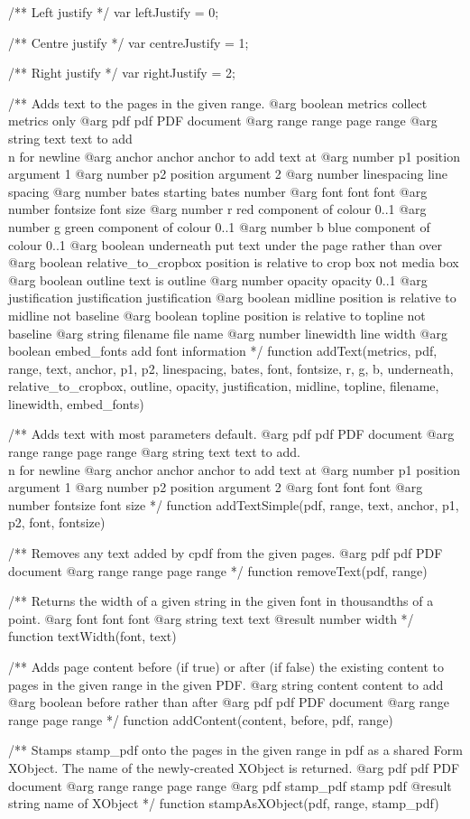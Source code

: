 /** Left justify */
var leftJustify = 0;

/** Centre justify */
var centreJustify = 1;

/** Right justify */
var rightJustify = 2;

/** Adds text to the pages in the given range.
@arg {boolean} metrics collect metrics only
@arg {pdf} pdf PDF document
@arg {range} range page range
@arg {string} text text to add \\n for newline
@arg {anchor} anchor anchor to add text at
@arg {number} p1 position argument 1
@arg {number} p2 position argument 2
@arg {number} linespacing line spacing
@arg {number} bates starting bates number
@arg {font} font font
@arg {number} fontsize font size
@arg {number} r red component of colour 0..1
@arg {number} g green component of colour 0..1
@arg {number} b blue component of colour 0..1
@arg {boolean} underneath put text under the page rather than over
@arg {boolean} relative_to_cropbox position is relative to crop box not media box
@arg {boolean} outline text is outline
@arg {number} opacity opacity 0..1
@arg {justification} justification justification
@arg {boolean} midline position is relative to midline not baseline
@arg {boolean} topline position is relative to topline not baseline
@arg {string} filename file name
@arg {number} linewidth line width
@arg {boolean} embed_fonts add font information
*/
function addText(metrics, pdf, range, text, anchor, p1, p2, linespacing,
                 bates, font, fontsize, r, g, b, underneath, relative_to_cropbox, outline,
                 opacity, justification, midline, topline, filename, linewidth, embed_fonts) {}

/** Adds text with most parameters default.
@arg {pdf} pdf PDF document
@arg {range} range page range
@arg {string} text text to add. \\n for newline
@arg {anchor} anchor anchor to add text at
@arg {number} p1 position argument 1
@arg {number} p2 position argument 2
@arg {font} font font
@arg {number} fontsize font size */
function addTextSimple(pdf, range, text, anchor, p1, p2, font, fontsize) {}

/** Removes any text added by cpdf from the given pages.
@arg {pdf} pdf PDF document
@arg {range} range page range */
function removeText(pdf, range) {}

/** Returns the width of a given string in the given font in thousandths of a
point.
@arg {font} font font
@arg {string} text text
@result {number} width */
function textWidth(font, text) {}

/** Adds page content before (if true) or after (if false) the existing
content to pages in the given range in the given PDF.
@arg {string} content content to add
@arg {boolean} before rather than after
@arg {pdf} pdf PDF document
@arg {range} range page range */
function addContent(content, before, pdf, range) {}

/** Stamps stamp_pdf onto the pages in the given range in pdf as a shared Form
XObject. The name of the newly-created XObject is returned.
@arg {pdf} pdf PDF document
@arg {range} range page range
@arg {pdf} stamp_pdf stamp pdf
@result {string} name of XObject */
function stampAsXObject(pdf, range, stamp_pdf) {}

